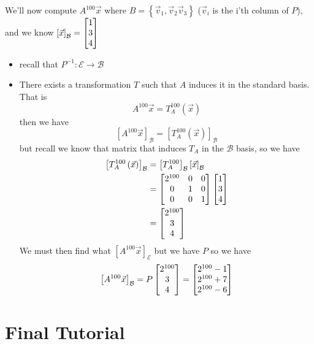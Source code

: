 \documentclass[11pt]{book}
\begin{document}
\begin{eg}
    We'll now compute $A^{100} \vec{x} $ where $B= \left\{ \vec{v} _{1} , \vec{v} _{2} \vec{v} _{3}  \right\} $ ($\vec{v} _{i} $ is the i'th column of $P$), and we know $\left[ \vec{x}  \right]_{\mathcal{B}} = \begin{bmatrix} 1 \\ 3 \\ 4 \end{bmatrix} $
    \begin{itemize}
        \item recall that $P^{-1} : \mathcal{E} \to \mathcal{B} $ 
        \item There exists a transformation $T$ such that $A$ induces it in the standard basis. That is 
            \[
            A^{100} \vec{x} = T^{100} _{A} \left(\vec{x} \right) 
            \]
            then we have 
            \[
            \left[ A^{100} \vec{x}  \right]_{\mathcal{B}} = \left[ T^{100} _{A} \left(\vec{x} \right)  \right]_{\mathcal{B}} 
            \]
            but recall we know that matrix that induces $T_{A} $ in the $\mathcal{B} $ basis, so we have 
            \begin{align*}
                \left[ T_{A} ^{100} \left( \vec{x}  \right)  \right]_{\mathcal{B}} &= \left[ T^{100} _{A}  \right]_{\mathcal{B}}\left[ \vec{x}  \right]_{\mathcal{B}}    \\ 
                &= \begin{bmatrix} 2^{100}  & 0 & 0 \\ 0 & 1 & 0 \\ 0 & 0 & 1 \end{bmatrix} \begin{bmatrix} 1 \\ 3 \\ 4 \end{bmatrix} \\
                &= \begin{bmatrix} 2^{100}  \\ 3 \\ 4 \end{bmatrix}  
            \end{align*}
        We must then find what $\left[ A^{100} \vec{x}  \right]_{\mathcal{E}} $ but we have $P$ so we have 
        \[
        \left[ A^{100} \vec{x}  \right]_{\mathcal{B}} = P\begin{bmatrix} 2^{100}  \\ 3 \\ 4 \end{bmatrix} = \begin{bmatrix} 2^{100}  - 1 \\ 2^{100}  + 7 \\ 2^{100} -6 \end{bmatrix} 
        \]
        
    \end{itemize}
\end{eg}



\section{Final Tutorial}%
\label{sec:final_tutorial}
\end{document}
